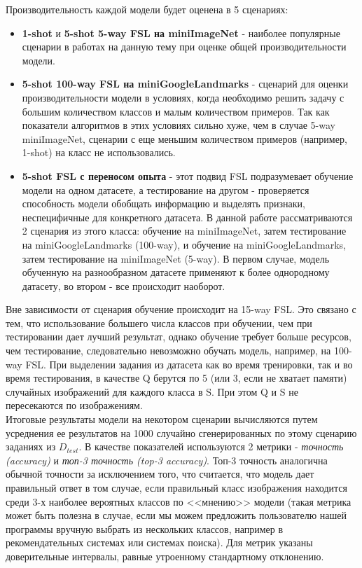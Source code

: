 \documentclass[a4paper, 12pt]{report}
\begin{document}
Производительность каждой модели будет оценена в 5 сценариях:
\begin{itemize}
\item \textbf{1-shot} и \textbf{5-shot 5-way FSL на miniImageNet} - наиболее популярные сценарии в работах на данную тему при оценке общей производительности модели.

\item \textbf{5-shot 100-way FSL на miniGoogleLandmarks} - сценарий для оценки производительности модели в условиях, когда необходимо решить задачу с большим количеством классов и малым количеством примеров. Так как показатели алгоритмов в этих условиях сильно хуже, чем в случае 5-way miniImageNet, сценарии с еще меньшим количеством примеров (например, 1-shot) на класс не использовались.

\item \textbf{5-shot FSL с переносом опыта} - этот подвид FSL подразумевает обучение модели на одном датасете, а тестирование на другом - проверяется способность модели обобщать информацию и выделять признаки, неспецифичные для конкретного датасета. В данной работе рассматриваются 2 сценария из этого класса: обучение на miniImageNet, затем тестирование на miniGoogleLandmarks (100-way), и обучение на miniGoogleLandmarks, затем тестирование на miniImageNet (5-way). В первом случае, модель обученную на разнообразном датасете применяют к более однородному датасету, во втором - все происходит наоборот.

\end{itemize}

Вне зависимости от сценария обучение происходит на 15-way FSL. Это связано с тем, что использование большего числа классов при обучении, чем при тестировании дает лучший результат, однако обучение требует больше ресурсов, чем тестирование, следовательно невозможно обучать модель, например, на 100-way FSL. При выделении задания из датасета как во время тренировки, так и во время тестирования, в качестве Q берутся по 5 (или 3, если не хватает памяти) случайных изображений для каждого класса в S. При этом Q и S не пересекаются по изображениям. \\

Итоговые результаты модели на некотором сценарии вычисляются путем усреднения ее результатов на 1000 случайно сгенерированных по этому сценарию заданиях из $D_{test}$. В качестве показателей используются 2 метрики - \textit{точность (accuracy)} и \textit{топ-3 точность (top-3 accuracy)}. Топ-3 точность аналогична обычной точности за исключением того, что считается, что модель дает правильный ответ в том случае, если правильный класс изображения находится среди 3-х наиболее вероятных классов по <<мнению>> модели (такая метрика может быть полезна в случае, если мы можем предложить пользователю нашей программы вручную выбрать из нескольких классов, например в рекомендательных системах или системах поиска). Для метрик указаны доверительные интервалы, равные утроенному стандартному отклонению. \\
\end{document}
